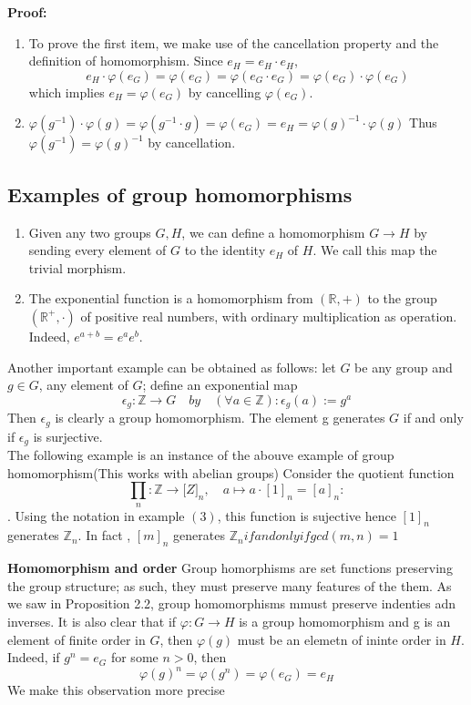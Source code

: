 \textbf{Proof:}
\begin{enumerate}
    \item To prove the first item, we make use of the cancellation property and the definition of homomorphism. Since $e_H = e_H \cdot e_H$,
    $$ e_H  \cdot \varphi(e_G) = \varphi(e_G) = \varphi(e_G \cdot e_G) = \varphi(e_G) \cdot \varphi(e_G) $$
    which implies $e_H = \varphi(e_G)$ by cancelling $\varphi(e_G)$.
    \item $\varphi(g^{-1}) \cdot \varphi(g) = \varphi(g^{-1} \cdot g) = \varphi(e_G) = e_H = \varphi(g)^{-1} \cdot \varphi(g)$
    Thus $\varphi(g^{-1}) = \varphi(g)^{-1}$ by cancellation.
\end{enumerate}

\subsection*{Examples of group homomorphisms}
\begin{enumerate}
    \item  Given any two groups $G, H$, we can define a homomorphism $G \to H$ by sending every element of $G$ to the identity $e_H$ of $H$. We call this map the trivial morphism.
    \item The exponential function is a homomorphism from $(\mathbb{R}, +)$ to the group $(\mathbb{R}^{+}, \cdot)$ of positive real numbers, with ordinary multiplication as operation. Indeed, $e^{a+b} = e^a e^b$.

\end{enumerate}
Another important example can be obtained as follows: let $G$ be any group and $g \in G$, any element of $G$; define an exponential map
$$\epsilon_g : \mathbb{Z} \to G \quad by \quad (\forall a \in \mathbb{Z}): \epsilon_g(a) := g^a $$
Then $\epsilon_g$ is clearly a group homomorphism. The element g generates $G$ if and only if $\epsilon_g$ is surjective. \\
The following example is an instance of the abouve example of group homomorphism(This works with abelian groups)
Consider the quotient function
$$\prod_n : \mathbb{Z} \to \mathbb[Z]_n, \quad a \mapsto a\cdot [1]_n = [a]_n:$$. Using the notation in example $(3)$, this function is sujective hence $[1]_n$ generates $\mathbb{Z}_n.$ In fact , $[m]_n$ generates $\mathbb{Z}_n if and only if gcd(m,n) = 1$


\textbf{Homomorphism and order}
Group homorphisms are set functions preserving the group structure; as such, they must preserve many features of the them.
As we saw in Proposition 2.2, group homomorphisms mmust preserve indenties adn inverses. It is also clear that if $\varphi : G \to H $ is a group homomorphism and g is an element of finite order in $G$, then $\varphi(g)$ must be an elemetn of ininte order in $H$. Indeed, if $g^n = e_G$ for some $n > 0$, then
$$\varphi(g)^n = \varphi(g^n) = \varphi(e_G) = e_H$$
We make this observation more precise

